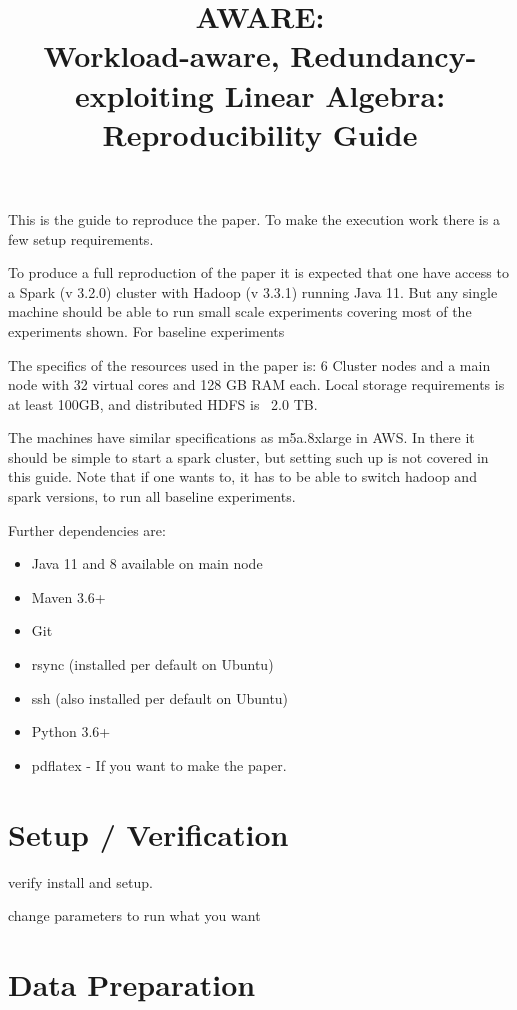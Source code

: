 \documentclass{readme}
\title{AWARE: \\ Workload-aware, Redundancy-exploiting Linear Algebra: \\ Reproducibility Guide}
\begin{document}
\maketitle


This is the guide to reproduce the paper.
To make the execution work there is a few setup requirements.

To produce a full reproduction of the paper it is expected that one have access to a Spark (v 3.2.0) cluster with Hadoop (v 3.3.1) running Java 11. But any single machine should be able to run small scale experiments covering most of the experiments shown. For baseline experiments 

The specifics of the resources used in the paper is: 6 Cluster nodes and a main node with 32 virtual cores and 128 GB RAM each. Local storage requirements is at least 100GB, and distributed HDFS is ~2.0 TB. 

The machines have similar specifications as m5a.8xlarge in AWS. In there it should be simple to start a spark cluster, but setting such up is not covered in this guide.
Note that if one wants to, it has to be able to switch hadoop and spark versions, to run all baseline experiments.

Further dependencies are:

\begin{itemize}
    \item Java 11 and 8 available on main node
    \item Maven 3.6+ 
    \item Git
    \item rsync (installed per default on Ubuntu)
    \item ssh (also installed per default on Ubuntu)
    \item Python 3.6+
    \item pdflatex - If you want to make the paper.
\end{itemize}

\section{Setup / Verification}

verify install and setup.

change parameters to run what you want

\section{Data Preparation}
\end{document}
